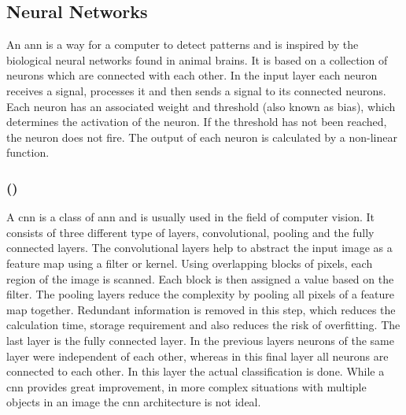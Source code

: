 \subsection{Neural Networks}
An \gls{ann} is a way for a computer to detect patterns and is inspired by the biological neural networks found in animal brains.
It is based on a collection of neurons which are connected with each other.
In the input layer each neuron receives a signal, processes it and then sends a signal to its connected neurons.
Each neuron has an associated weight and threshold (also known as bias), which determines the activation of the neuron.
If the threshold has not been reached, the neuron does not fire.
The output of each neuron is calculated by a non-linear function.

\subsubsection{ ()}
A \gls{cnn} is a class of \gls{ann} and is usually used in the field of computer vision.
It consists of three different type of layers, convolutional, pooling and the fully connected layers.
The convolutional layers help to abstract the input image as a feature map using a filter or kernel.
Using overlapping blocks of pixels, each region of the image is scanned.
Each block is then assigned a value based on the filter.
The pooling layers reduce the complexity by pooling all pixels of a feature map together.
Redundant information is removed in this step, which reduces the calculation time, storage requirement and also reduces the risk of overfitting.
The last layer is the fully connected layer.
In the previous layers neurons of the same layer were independent of each other, whereas in this final layer all neurons are connected to each other.
In this layer the actual classification is done.
While a \gls{cnn} provides great improvement, in more complex situations with multiple objects in an image the \gls{cnn} architecture is not ideal.

